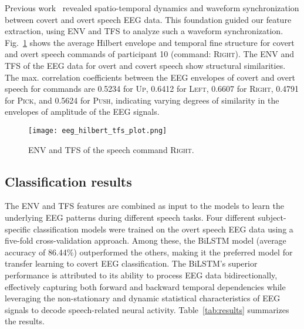 \documentclass[onecolumn]{IEEEtran}
\begin{document}
Previous work~\cite{watanabe2020synchronization, zhang2024revealing,oppenheim2010motor} revealed spatio-temporal dynamics and waveform synchronization between covert and overt speech EEG data. This foundation guided our feature extraction, using ENV and TFS to analyze such a waveform synchronization. Fig.~\ref{fig:ExampleEyeBlinks} shows the average Hilbert envelope and temporal fine structure for covert and overt speech commands of participant 10 (command: \textsc{Right}). The ENV and TFS of the EEG data for overt and covert speech show structural similarities. The max. correlation coefficients between the EEG envelopes of covert and overt speech for commands are 0.5234 for \textsc{Up}, 0.6412 for \textsc{Left}, 0.6607 for \textsc{Right}, 0.4791 for \textsc{Pick}, and 0.5624 for \textsc{Push}, indicating varying degrees of similarity in the envelopes of amplitude of the EEG signals. 

\begin{figure}[!ht]
    \centering
    \texttt{[image: eeg\_hilbert\_tfs\_plot.png]}
    \caption{ENV and TFS of the speech command \textsc{Right}.}
    \label{fig:ExampleEyeBlinks}
\end{figure}

\subsection{Classification results}

The ENV and TFS features are combined as input to the models 
to learn the underlying EEG patterns during different speech tasks.
Four different subject-specific classification models 
were trained on the overt speech EEG data using a five-fold cross-validation approach. 
Among these, the BiLSTM model (average accuracy of 86.44\%) outperformed the others, 
making it the preferred model for transfer learning to covert EEG classification.
The BiLSTM's superior performance is attributed to its ability to process EEG data bidirectionally, effectively capturing both forward and backward temporal dependencies while leveraging the non-stationary and dynamic statistical characteristics of EEG signals to decode speech-related neural activity.
Table~\ref{tab:results} summarizes the results.
\end{document}
